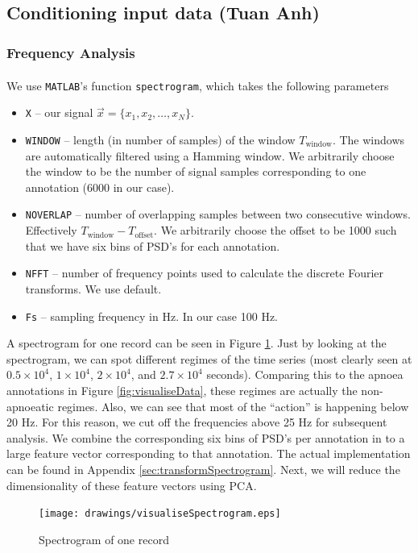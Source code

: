 \subsection{Conditioning input data (Tuan Anh)}
\label{sec:conditioningExperiments-ta}

\subsubsection{Frequency Analysis}
	We use \verb!MATLAB!\textsuperscript{\textregistered}'s function \verb|spectrogram|, which takes the following parameters
	\begin{itemize}
		\item \verb!X! -- our signal $\vec x = \{x_1, x_2, \dotsc, x_N\}$.
		\item \verb!WINDOW! -- length (in number of samples) of the window $T_\text{window}$. The windows are automatically filtered using a Hamming window. We arbitrarily choose the window to be the number of signal samples corresponding to one annotation (6000 in our case).
		\item \verb!NOVERLAP! -- number of overlapping samples between two consecutive windows. Effectively $T_\text{window} - T_\text{offset}$. We arbitrarily choose the offset to be 1000 such that we have six bins of PSD's for each annotation.
		\item \verb!NFFT! -- number of frequency points used to calculate the discrete Fourier transforms. We use default.
		\item \verb!Fs! -- sampling frequency in Hz. In our case 100 Hz.
	\end{itemize}

	A spectrogram for one record can be seen in Figure \ref{fig:visualiseSpectrogram}. Just by looking at the spectrogram, we can spot different regimes of the time series (most clearly seen at $0.5 \times 10^4$, $1 \times 10^4$, $2 \times 10^4$, and $2.7 \times 10^4$ seconds). Comparing this to the apnoea annotations in Figure \ref{fig:visualiseData}, these regimes are actually the non-apnoeatic regimes. Also, we can see that most of the ``action'' is happening below 20 Hz. For this reason, we cut off the frequencies above 25 Hz for subsequent analysis. We combine the corresponding six bins of PSD's per annotation in to a large feature vector corresponding to that annotation. The actual implementation can be found in Appendix \ref{sec:transformSpectrogram}. Next, we will reduce the dimensionality of these feature vectors using PCA.
	\begin{figure}[ht!]
		\centering
			\texttt{[image: drawings/visualiseSpectrogram.eps]}
		\caption{Spectrogram of one record}
		\label{fig:visualiseSpectrogram}
	\end{figure}

